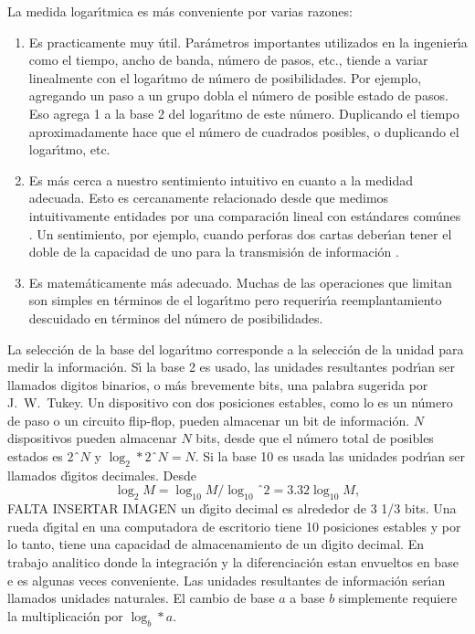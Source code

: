 La medida logar\'{\i}tmica es m\'{a}s conveniente por varias razones:
\begin{enumerate}
\item{Es practicamente muy \'{u}til. Par\'{a}metros importantes utilizados en la
ingenier\'{\i}a como el tiempo, ancho de banda, n\'{u}mero de pasos,
etc., tiende a variar linealmente con el logar\'{\i}tmo de n\'{u}mero
de posibilidades. Por ejemplo, agregando un paso a un grupo dobla el
n\'{u}mero de posible estado de pasos. Eso agrega 1 a la base 2 del
logar\'{\i}tmo de este n\'{u}mero. Duplicando el tiempo
aproximadamente hace que el n\'{u}mero de cuadrados posibles, o
duplicando el logar\'{\i}tmo, etc.}
\item{Es m\'{a}s cerca a nuestro sentimiento intuitivo en cuanto a la medidad
adecuada. Esto es cercanamente relacionado desde que medimos
intuitivamente entidades por una comparaci\'{o}n lineal con est\'{a}ndares
com\'{u}nes \cite{FALTA}. Un sentimiento, por ejemplo, cuando perforas
dos cartas deber\'{\i}an tener el doble de la capacidad de uno para la
transmisi\'{o}n de informaci\'{o}n \cite{FALTA}.}
\item{Es matem\'{a}ticamente m\'{a}s adecuado. Muchas de las operaciones que
limitan son simples en t\'{e}rminos de el logar\'{\i}tmo pero requerir\'{\i}a
reemplantamiento descuidado en t\'{e}rminos del n\'{u}mero de posibilidades.}
\end{enumerate}

La selecci\'{o}n de la base del logar\'{\i}tmo corresponde a la
selecci\'{o}n de la unidad para medir la informaci\'{o}n. S\'{\i} la
base 2 es usado, las unidades resultantes podr\'{\i}an ser llamados
digitos binarios, o m\'{a}s brevemente bits, una palabra sugerida por
J.\ W.\ Tukey. Un dispositivo con dos posiciones estables, como lo es
un n\'{u}mero de paso o un circuito flip-flop, pueden almacenar un bit
de informaci\'{o}n. $N$ dispositivos pueden almacenar $N$ bits, desde
que el n\'{u}mero total de posibles estados es $2ˆN$ y $\log_2 * 2ˆN =
N$. Si la base 10 es usada las unidades podr\'{\i}an ser llamados
d\'{\i}gitos decimales. Desde
\begin{equation}
\log_2 M = \log_10 M / \log_10ˆ2 = 3.32 \log_10 M,
\end{equation}
FALTA INSERTAR IMAGEN 
un d\'{\i}gito decimal es alrededor de 3 1/3
bits. Una rueda d\'{\i}gital en una computadora de escritorio tiene 10
posiciones estables y por lo tanto, tiene una capacidad de
almacenamiento de un d\'{\i}gito decimal. En trabajo analitico donde
la integraci\'{o}n y la diferenciaci\'{o}n estan envueltos en base e
es algunas veces conveniente. Las unidades resultantes de
informaci\'{o}n ser\'{\i}an llamados unidades naturales. El cambio de
base $a$ a base $b$ simplemente requiere la multiplicaci\'{o}n por
$\log_b * a$.

